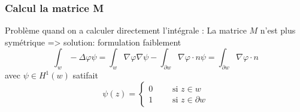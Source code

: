 \begin{frame}
\frametitle{Calcul la matrice M}
Probl\`eme quand on a calculer directement l'int\'egrale : La matrice $M$ n'est plus sym\'etrique
=> solution: formulation faiblement
\begin{equation}
\int_w -\Delta\varphi \psi =\int_w \nabla\varphi\nabla\psi - \int_{\partial w} \nabla\varphi\cdot n \psi =\int_{\partial w} \nabla\varphi\cdot n
\end{equation}
avec $\psi \in H^1(w)$ satifait
\begin{equation}
\psi(z) =
\begin{cases}
0 \qquad \text{ si } z\in w \\
1 \qquad \text{ si } z\in \partial w
\end{cases}
\end{equation}


\end{frame}
